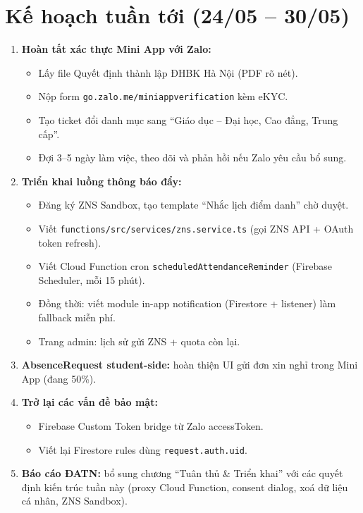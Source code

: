 \documentclass{article}
\begin{document}
\section{Kế hoạch tuần tới (24/05 -- 30/05)}

\begin{enumerate}[leftmargin=1.5em]
  \item \textbf{Hoàn tất xác thực Mini App với Zalo:}
  \begin{itemize}[leftmargin=1em]
    \item Lấy file Quyết định thành lập ĐHBK Hà Nội (PDF rõ nét).
    \item Nộp form \texttt{go.zalo.me/miniappverification} kèm eKYC.
    \item Tạo ticket đổi danh mục sang ``Giáo dục -- Đại học, Cao đẳng, Trung cấp''.
    \item Đợi 3--5 ngày làm việc, theo dõi và phản hồi nếu Zalo yêu cầu bổ sung.
  \end{itemize}
  \item \textbf{Triển khai luồng thông báo đẩy:}
  \begin{itemize}[leftmargin=1em]
    \item Đăng ký ZNS Sandbox, tạo template ``Nhắc lịch điểm danh'' chờ duyệt.
    \item Viết \texttt{functions/src/services/zns.service.ts} (gọi ZNS API + OAuth token refresh).
    \item Viết Cloud Function cron \texttt{scheduledAttendanceReminder} (Firebase Scheduler, mỗi 15 phút).
    \item Đồng thời: viết module in-app notification (Firestore + listener) làm fallback miễn phí.
    \item Trang admin: lịch sử gửi ZNS + quota còn lại.
  \end{itemize}
  \item \textbf{AbsenceRequest student-side:} hoàn thiện UI gửi đơn xin nghỉ trong Mini App (đang 50\%).
  \item \textbf{Trở lại các vấn đề bảo mật:}
  \begin{itemize}[leftmargin=1em]
    \item Firebase Custom Token bridge từ Zalo accessToken.
    \item Viết lại Firestore rules dùng \texttt{request.auth.uid}.
  \end{itemize}
  \item \textbf{Báo cáo ĐATN:} bổ sung chương ``Tuân thủ \& Triển khai'' với các quyết định kiến trúc tuần này (proxy Cloud Function, consent dialog, xoá dữ liệu cá nhân, ZNS Sandbox).
\end{enumerate}
\end{document}
